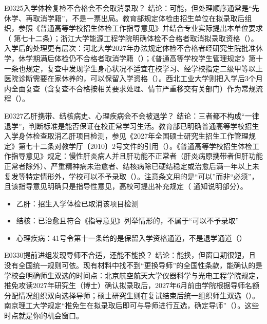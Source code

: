 \begin{qa}{E0325}{入学体检复检不合格会不会取消录取？}
结论：可能，但处理顺序通常是“先休学、再取消学籍”，不是一票出局。教育部规定体检由招生单位在拟录取后组织，参照《普通高等学校招生体检工作指导意见》并结合专业实际提出本单位要求（ 第七十二条）；浙江大学能源工程学院明确体检不合格者取消拟录取资格（）。入学后的处理更有层次：河北大学2027年办法规定体检不合格者经研究生院批准休学，休学期满后体检仍不合格者取消学籍（）；《普通高等学校学生管理规定》第十一条也规定，复查中发现学生身心状况不适宜在校学习、经学校指定二级甲等以上医院诊断需要在家休养的，可以保留入学资格（）。西北工业大学则把入学后3个月内全面复查（含复查不合格按相关要求处理、情节严重移交有关部门）作为常规流程（）。
\end{qa}

\begin{qa}{E0327}{乙肝携带、结核病史、心理疾病会不会被退学？}
结论：三者都不构成“一律退学”，判断标准是能否保证在校正常学习生活。教育部已明确普通高等学校招生入学身体检查取消乙肝项目检测，参见《2027年全国硕士研究生招生工作管理规定》第七十二条对教学厅〔2010〕2号文件的引用（）。《普通高等学校招生体检工作指导意见》规定：慢性肝炎病人并且肝功能不正常者（肝炎病原携带者但肝功能正常者除外）、严重精神病未治愈者、结核病除已硬结稳定或治愈后满一年以上未复发等特定情形外，学校可以不予录取（）。注意条文用的是“可以”而非“必须”，且该指导意见明确只是指导性意见，高校可提出补充规定（ 通知说明部分）。

\begin{itemize}
  \item 乙肝：招生入学体检已取消该项目检测
  \item 结核：已治愈且符合《指导意见》列举情形的，不属于“可以不予录取”
  \item 心理疾病：41号令第十一条给的是保留入学资格通道，不是退学通道（）
\end{itemize}
\end{qa}

\begin{qa}{E0330}{提前进组发现导师不合适，还能不能换？}
结论：能换，但窗口期很短，且没有全国统一规则可依。现有材料中找不到“更换导师”的全国性条款，能确认的是学校会明确师生双选的时间点：北京航空航天大学仪器科学与光电工程学院规定，推免攻读2027年研究生（博士）确认拟录取后，2027年6月前由学院根据导师名额分配情况组织双向选择导师；硕士研究生则在复试结束后统一组织师生双选（）。南京理工大学规定“推免生在拟录取后即可与导师进行互选，确定导师”（）。这些时点就是你的机会窗口。
\end{qa}

